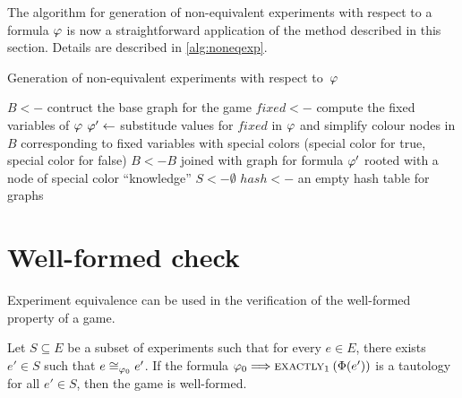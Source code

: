 The algorithm for generation of non-equivalent experiments with respect to a formula $\varphi$
  is now a straightforward application of the method described in this section.
Details are described in \autoref{alg:noneqexp}.

\begin{algorithm}[h!]
\caption{Generation of non-equivalent experiments with respect to~$\varphi$}
\label{alg:noneqexp}
\DontPrintSemicolon
$B <- $ contruct the base graph for the game\;
$fixed <- $ compute the fixed variables of $\varphi$\;
$\varphi' <- $ substitude values for $fixed$ in $\varphi$ and simplify\;
colour nodes in $B$ corresponding to fixed variables with special colors (special color for true, special color for false)\;
$B <- B$ joined with graph for formula $\varphi'$ rooted with a node of special color ``knowledge''\;
$S <- \emptyset$\;
$hash <- $ an empty hash table for graphs\;
\end{algorithm}


\section{Well-formed check}

Experiment equivalence can be used in the verification
  of the well-formed property of a game.

\begin{lemma} \label{lma:well-formed}
  Let $S\subseteq E$ be a subset of experiments
  such that for every $e\in E$, there exists $e'\in S$
   such that $e\cong_{\varphi_0}e'$.
  If the formula $\varphi_0 ==> \textsc{exactly}_{1}\:(\Phi(e'))$ is a tautology for
  all $e'\in S$, then the game is well-formed.
\end{lemma}

